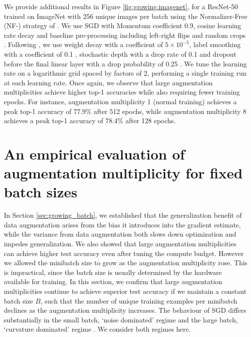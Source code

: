 \documentclass{article}
\begin{document}
We provide additional results in Figure \ref{fig:growing:imagenet}, for a ResNet-50 \citep{he2016identity} trained on ImageNet \citep{ILSVRC15} with 256 unique images per batch using the Normalizer-Free (NF-) strategy of \citet{brock2021characterizing}. We use SGD with Momentum coefficient 0.9,  cosine learning rate decay \citep{loshchilov2016sgdr} and baseline pre-processing including left-right flips and random crops \citep{szegedy2017inception}. 
Following \citet{brock2021characterizing}, we use weight decay with a coefficient of $5\times10^{-5}$, label smoothing with a coefficient of 0.1 \citep{szegedy2016rethinking}, stochastic depth with a drop rate of 0.1 \citep{huang2016deep} and dropout before the final linear layer with a drop probability of 0.25 \citep{srivastava2014dropout}. 
We tune the learning rate on a logarithmic grid spaced by factors of 2, performing a single training run at each learning rate. Once again, we observe that large augmentation multiplicities achieve higher top-1 accuracies while also requiring fewer training epochs. For instance, augmentation multiplicity 1 (normal training) achieves a peak top-1 accuracy of 77.9$\%$ after 512 epochs, while augmentation multiplicity 8 achieves a peak top-1 accuracy of 78.4$\%$ after 128 epochs.
 














 

\section{An empirical evaluation of augmentation multiplicity for fixed batch sizes}

\label{sec:fixed}

In Section \ref{sec:growing_batch}, we established that the generalization benefit of data augmentation arises from the bias it introduces into the gradient estimate, while the variance from data augmentation both slows down optimization and impedes generalization. We also showed that large augmentation multiplicities can achieve higher test accuracy even after tuning the compute budget. However we allowed the minibatch size to grow as the augmentation multiplicity rose. This is impractical, since the batch size is usually determined by the hardware available for training. In this section, we confirm that large augmentation multiplicities continue to achieve superior test accuracy if we maintain a constant batch size $B$, such that the number of unique training examples per minibatch declines as the augmentation multiplicity increases. The behaviour of SGD differs substantially in the small batch, `noise dominated' regime and the large batch, `curvature dominated' regime \citep{ma2017power,zhang2019algorithmic, smith2020generalization}. We consider both regimes here.
\end{document}
